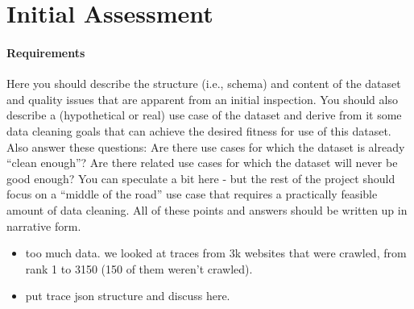 \section{Initial Assessment}
\paragraph{Requirements}
Here you should describe the structure (i.e., schema) and content of the dataset and quality issues that are apparent from an initial inspection. You should also describe a (hypothetical or real) use case of the dataset and derive from it some data cleaning goals that can achieve the desired fitness for use of this dataset. Also answer these questions: Are there use cases for which the dataset is already ``clean enough''? Are there related use cases for which the dataset will never be good enough? You can speculate a bit here - but the rest of the project should focus on a ``middle of the road'' use case that requires a practically feasible amount of data cleaning. All of these points and answers should be written up in narrative form.

\begin{itemize}[nolistsep]
	\item too much data. we looked at traces from 3k websites that were crawled, from rank 1 to 3150 (150 of them weren't crawled).
	\item put trace json structure and discuss here.
\end{itemize}